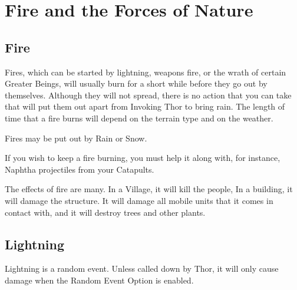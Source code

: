 
\chapter{Fire and the Forces of Nature}

\section{Fire}


Fires, which can be started by lightning, weapons fire, or the wrath of certain Greater Beings, will usually burn for a short while before they go out by themselves. Although they will not spread, there is no action that you can take that will put them out apart from Invoking Thor to bring rain. The length of time that a fire burns will depend on the terrain type and on the weather.

Fires may be put out by Rain or Snow.

If you wish to keep a fire burning, you must help it along with, for instance, Naphtha projectiles from your Catapults.

The effects of fire are many. In a Village, it will kill the people, In a building, it will damage the structure. It will damage all mobile units that it comes in contact with, and it will destroy trees and other plants.

\section{Lightning}


Lightning is a random event. Unless called down by Thor, it will only cause damage when the Random Event Option is enabled. 

